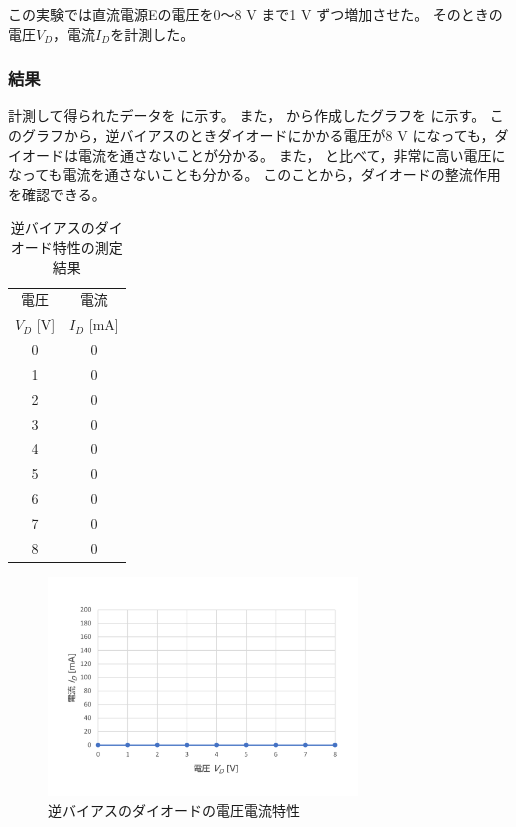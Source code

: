   この実験では直流電源Eの電圧を0～8 V まで1 V ずつ増加させた。
  そのときの電圧$V_D$，電流$I_D$を計測した。

\subsubsection{結果}
  計測して得られたデータを に示す。
  また， から作成したグラフを に示す。
  このグラフから，逆バイアスのときダイオードにかかる電圧が8 V になっても，ダイオードは電流を通さないことが分かる。
  また， と比べて，非常に高い電圧になっても電流を通さないことも分かる。
  このことから，ダイオードの整流作用\cite{tyosho:densiKairo} を確認できる。

  \begin{table}[hbt]
    \centering
    \caption{逆バイアスのダイオード特性の測定結果}
    \begin{tabular}{|c|c|} \hline
        電圧 & 電流 \\
        $V_D$ [V] & $I_D$ [mA] \\ \hline
        0 & 0 \\ \hline
        1 & 0 \\ \hline
        2 & 0 \\ \hline
        3 & 0 \\ \hline
        4 & 0 \\ \hline
        5 & 0 \\ \hline
        6 & 0 \\ \hline
        7 & 0 \\ \hline
        8 & 0 \\ \hline
    \end{tabular}
    \label{tab:diode2_result}
  \end{table}

  \begin{figure}[!h]
    \centering
    \includegraphics[width=8.2cm]{./figs/G-reverse_bias_ID-VD}
    \caption{逆バイアスのダイオードの電圧電流特性}
    \label{fig:reverse_bias_ID-VD}
  \end{figure}


